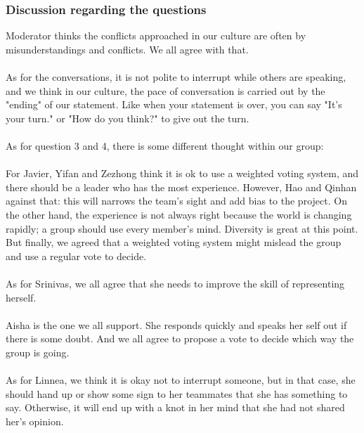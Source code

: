 		\subsubsection{Discussion regarding the questions}
		Moderator thinks the conflicts approached in our culture are often by misunderstandings and conflicts.  We all agree with that.\\\\
		As for the conversations, it is not polite to interrupt while others are speaking, and we think in our culture, the pace of conversation is carried out by the "ending" of our statement. Like when your statement is over, you can say "It's your turn." or "How do you think?" to give out the turn. \\\\
		As for question 3 and 4, there is some different thought within our group:\\\\
		For Javier, Yifan and Zezhong think it is ok to use a weighted voting system, and there should be a leader who has the most experience. However, Hao and Qinhan against that: this will narrows the team's sight and add bias to the project. On the other hand, the experience is not always right because the world is changing rapidly; a group should use every member's mind. Diversity is great at this point. But finally, we agreed that a weighted voting system might mislead the group and use a regular vote to decide.\\\\
		As for Srinivas, we all agree that she needs to improve the skill of representing herself.\\\\
		Aisha is the one we all support. She responds quickly and speaks her self out if there is some doubt. And we all agree to propose a vote to decide which way the group is going.\\\\
		As for Linnea, we think it is okay not to interrupt someone, but in that case, she should hand up or show some sign to her teammates that she has something to say. Otherwise, it will end up with a knot in her mind that she had not shared her's opinion.
		
		
